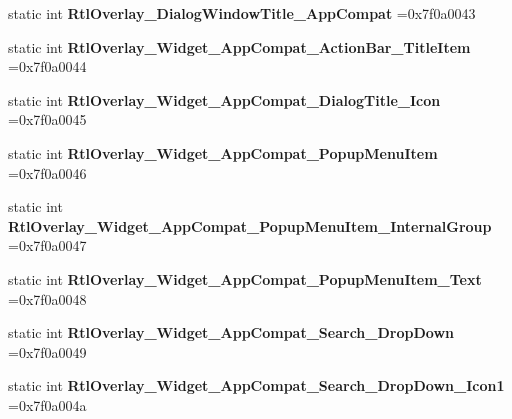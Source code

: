 \begin{DoxyCompactItemize}
static int {\bfseries Rtl\+Overlay\+\_\+\+Dialog\+Window\+Title\+\_\+\+App\+Compat} =0x7f0a0043
\item 
\mbox{\label{classandroid_1_1support_1_1v7_1_1cardview_1_1R_1_1style_a3125cb8b9187d4318a7d1dda3b652d0f}} 
static int {\bfseries Rtl\+Overlay\+\_\+\+Widget\+\_\+\+App\+Compat\+\_\+\+Action\+Bar\+\_\+\+Title\+Item} =0x7f0a0044
\item 
\mbox{\label{classandroid_1_1support_1_1v7_1_1cardview_1_1R_1_1style_ae1fd06c0c18d4b6715f5d56b9e4a1342}} 
static int {\bfseries Rtl\+Overlay\+\_\+\+Widget\+\_\+\+App\+Compat\+\_\+\+Dialog\+Title\+\_\+\+Icon} =0x7f0a0045
\item 
\mbox{\label{classandroid_1_1support_1_1v7_1_1cardview_1_1R_1_1style_a1bd932e935ad7542d2dfde7a971df1f5}} 
static int {\bfseries Rtl\+Overlay\+\_\+\+Widget\+\_\+\+App\+Compat\+\_\+\+Popup\+Menu\+Item} =0x7f0a0046
\item 
\mbox{\label{classandroid_1_1support_1_1v7_1_1cardview_1_1R_1_1style_a77ef3bc8bdf16d9bdfc644417362cf0e}} 
static int {\bfseries Rtl\+Overlay\+\_\+\+Widget\+\_\+\+App\+Compat\+\_\+\+Popup\+Menu\+Item\+\_\+\+Internal\+Group} =0x7f0a0047
\item 
\mbox{\label{classandroid_1_1support_1_1v7_1_1cardview_1_1R_1_1style_a5649d99784dbe0fd5c92f420b8bb63fb}} 
static int {\bfseries Rtl\+Overlay\+\_\+\+Widget\+\_\+\+App\+Compat\+\_\+\+Popup\+Menu\+Item\+\_\+\+Text} =0x7f0a0048
\item 
\mbox{\label{classandroid_1_1support_1_1v7_1_1cardview_1_1R_1_1style_ae9c48146b61a596cab8057f490d132e6}} 
static int {\bfseries Rtl\+Overlay\+\_\+\+Widget\+\_\+\+App\+Compat\+\_\+\+Search\+\_\+\+Drop\+Down} =0x7f0a0049
\item 
\mbox{\label{classandroid_1_1support_1_1v7_1_1cardview_1_1R_1_1style_a41c06ad31c9865e958e89b218b5c167e}} 
static int {\bfseries Rtl\+Overlay\+\_\+\+Widget\+\_\+\+App\+Compat\+\_\+\+Search\+\_\+\+Drop\+Down\+\_\+\+Icon1} =0x7f0a004a

\end{DoxyCompactItemize}
